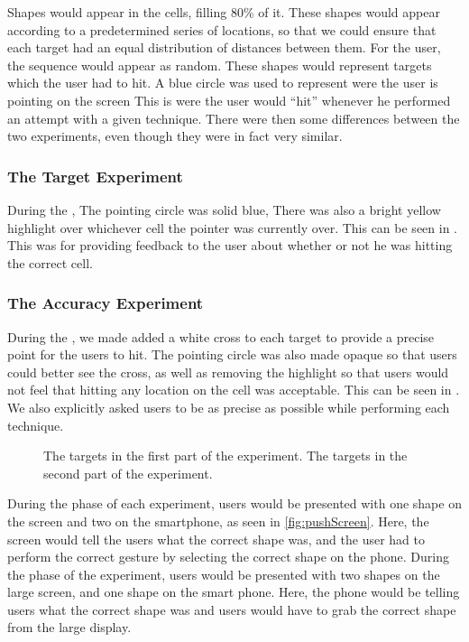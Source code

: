 Shapes would appear in the cells, filling 80\% of it. 
These shapes would appear according to a predetermined series of locations, so that we could ensure that each target had an equal distribution of distances between them. 
For the user, the sequence would appear as random. 
These shapes would represent targets which the user had to hit.
A blue circle was used to represent were the user is pointing on the screen
This is were the user would ``hit'' whenever he performed an attempt with a given technique.
There were then some differences between the two experiments, even though they were in fact very similar.

\subsubsection{The Target Experiment} 
During the \target, The pointing circle was solid blue, 
There was also a bright yellow highlight over whichever cell the pointer was currently over.
This can be seen in .
This was for providing feedback to the user about whether or not he was hitting the correct cell. 

\subsubsection{The Accuracy Experiment}
During the \accuracy, we made added a white cross to each target to provide a precise point for the users to hit.
The pointing circle was also made opaque so that users could better see the cross, as well as removing the highlight so that users would not feel that hitting any location on the cell was acceptable.
This can be seen in .
We also explicitly asked users to be as precise as possible while performing each technique.

\begin{figure}[H]
\centering
{}
\hspace{0.05\columnwidth}
\caption{\protect{} The targets in the first part of the experiment. \protect{} The targets in the second part of the experiment.}
\end{figure}

During the \push phase of each experiment, users would be presented with one shape on the screen and two on the smartphone, as seen in \cref{fig:pushScreen}.
Here, the screen would tell the users what the correct shape was, and the user had to perform the correct gesture by selecting the correct shape on the phone.
During the \pull phase of the experiment, users would be presented with two shapes on the large screen, and one shape on the smart phone.
Here, the phone would be telling users what the correct shape was and users would have to grab the correct shape from the large display. 

